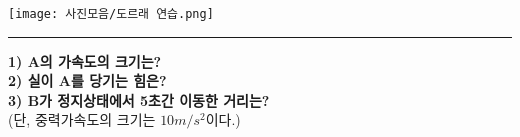 \begin{flushleft}
  \begin{task}
 \begin{flushleft}
  {
  {\texttt{[image: 사진모음/도르래 연습.png]}
  \label{fig:도르래상황2}}%
  {\rule{\linewidth}{4cm}}}
 \end{flushleft}
 \textbf{1) A의 가속도의 크기는?\\ 2) 실이 A를 당기는 힘은?\\3) B가 정지상태에서 5초간 이동한 거리는? } \\
 (단, 중력가속도의 크기는 $10m/s^2$이다.)
\end{task}


\end{flushleft}